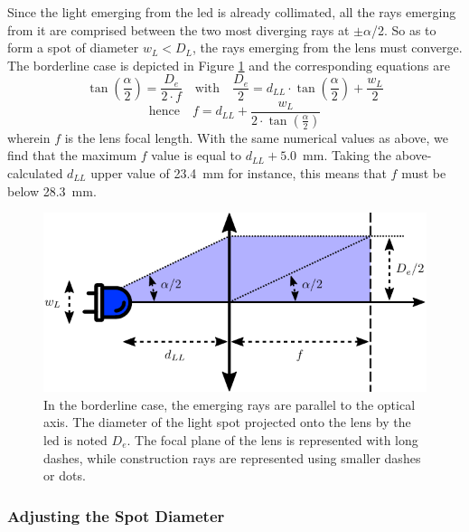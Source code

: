 Since the light emerging from the \gls{led} is already collimated, all the rays emerging from it are comprised between the two most diverging rays at $\pm\alpha$/2. So as to form a spot of diameter $w_L < D_L$, the rays emerging from the lens must converge. The borderline case is depicted in Figure \ref{anfig:optics:illuminating_focal} and the corresponding equations are
\begin{equation}
	\tan \left( \frac{\alpha}{2} \right) = \frac{D_e}{2 \cdot f} \quad \text{with} \quad
	\frac{D_e}{2} = d_{LL}\cdot \tan \left( \frac{\alpha}{2} \right) + \frac{w_L}{2}
\end{equation}
\begin{equation}
	\text{hence}\quad f = d_{LL} + \frac{w_L}{2 \cdot \tan \left( \frac{\alpha}{2} \right)}
\end{equation}
wherein $f$ is the lens focal length. With the same numerical values as above, we find that the maximum $f$ value is equal to $d_{LL}+5.0$~mm. Taking the above-calculated $d_{LL}$ upper value of 23.4~mm for instance, this means that $f$ must be below 28.3~mm.

\begin{figure}
	\centering
	\includegraphics{2_appendices/optical_figures/illuminating_focal_converted.pdf}
	\caption[In the borderline case, the emerging rays are parallel to the optical axis.]{In the borderline case, the emerging rays are parallel to the optical axis. The diameter of the light spot projected onto the lens by the \gls{led} is noted $D_e$. The focal plane of the lens is represented with long dashes, while construction rays are represented using smaller dashes or dots.}
	\label{anfig:optics:illuminating_focal}
\end{figure}

\subsubsection{Adjusting the Spot Diameter}

